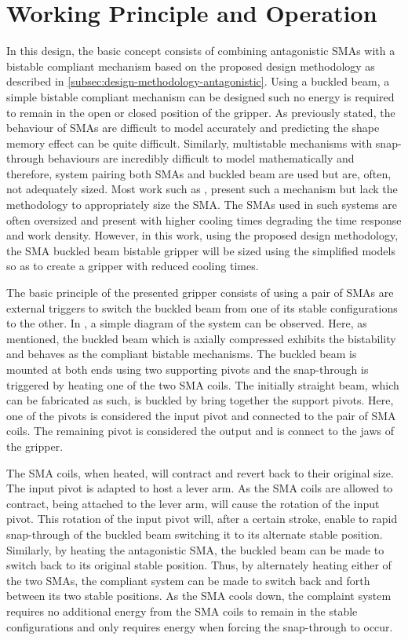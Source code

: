 \section{Working Principle and Operation}
In this design, the basic concept consists of combining antagonistic SMAs with a bistable compliant mechanism based on the proposed design methodology as described in \cref{subsec:design-methodology-antagonistic}. Using a buckled beam, a simple bistable compliant mechanism can be designed such no energy is required to remain in the open or closed position of the gripper. As previously stated, the behaviour of SMAs are difficult to model accurately and predicting the shape memory effect can be quite difficult. Similarly, multistable mechanisms with snap-through behaviours are incredibly difficult to model mathematically and therefore, system pairing both SMAs and buckled beam are used but are, often, not adequately sized. Most work such as \todocite, present such a mechanism but lack the methodology to appropriately size the SMA. The SMAs used in such systems are often oversized and present with higher cooling times degrading the time response and work density. However, in this work, using the proposed design methodology, the SMA buckled beam bistable gripper will be sized using the simplified models so as to create a gripper with reduced cooling times.

The basic principle of the presented gripper consists of using a pair of SMAs are external triggers to switch the buckled beam from one of its stable configurations to the other. In \todocite, a simple diagram of the system can be observed. Here, as mentioned, the buckled beam which is axially compressed exhibits the bistability and behaves as the compliant bistable mechanisms. The buckled beam is mounted at both ends using two supporting pivots and the snap-through is triggered by heating one of the two SMA coils. The initially straight beam, which can be fabricated as such, is buckled by bring together the support pivots. Here, one of the pivots is considered the input pivot and connected to the pair of SMA coils. The remaining pivot is considered the output and is connect to the jaws of the gripper.

The SMA coils, when heated, will contract and revert back to their original size. The input pivot is adapted to host a lever arm. As the SMA coils are allowed to contract, being attached to the lever arm, will cause the rotation of the input pivot. This rotation of the input pivot will, after a certain stroke, enable to rapid snap-through of the buckled beam switching it to its alternate stable position. Similarly, by heating the antagonistic SMA, the buckled beam can be made to switch back to its original stable position. Thus, by alternately heating either of the two SMAs, the compliant system can be made to switch back and forth between its two stable positions. As the SMA cools down, the complaint system requires no additional energy from the SMA coils to remain in the stable configurations and only requires energy when forcing the snap-through to occur.

